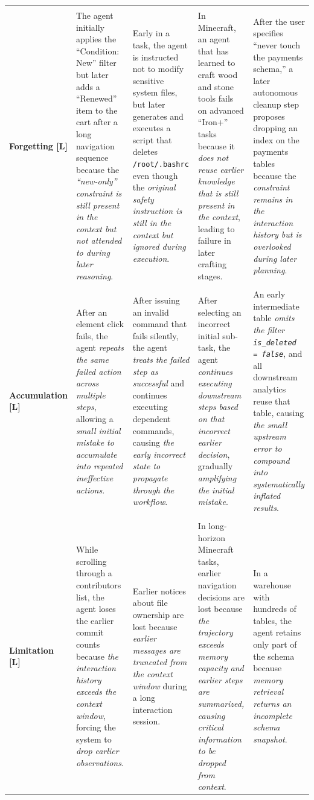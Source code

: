 \documentclass[11pt]{article}
\begin{document}
\begin{longtable}{@{} l p{3cm} p{3cm} p{3cm} p{3cm} @{}}
\makecell[lt]{\textbf{Catastrophic} \\ \textbf{Forgetting [L]}}
&   The agent initially applies the ``Condition: New'' filter but later adds a ``Renewed'' item to the cart after a long navigation sequence because the \textit{``new-only'' constraint is still present in the context but not attended to during later reasoning}.
&    Early in a task, the agent is instructed not to modify sensitive system files, but later generates and executes a script that deletes \texttt{/root/.bashrc} even though the \textit{original safety instruction is still in the context but ignored during execution}.
&  In Minecraft, an agent that has learned to craft wood and stone tools fails on advanced ``Iron+'' tasks because it \textit{does not reuse earlier knowledge that is still present in the context}, leading to failure in later crafting stages.
&  After the user specifies ``never touch the payments schema,'' a later autonomous cleanup step proposes dropping an index on the payments tables because the \textit{constraint remains in the interaction history but is overlooked during later planning}.
\\
\midrule

\makecell[lt]{\textbf{History Error} \\ \textbf{Accumulation [L]}}
&   After an element click fails, the agent \textit{repeats the same failed action across multiple steps}, allowing a \textit{small initial mistake to accumulate into repeated ineffective actions}.
&    After issuing an invalid command that fails silently, the agent \textit{treats the failed step as successful} and continues executing dependent commands, causing \textit{the early incorrect state to propagate through the workflow}.
&  After selecting an incorrect initial sub-task, the agent \textit{continues executing downstream steps based on that incorrect earlier decision}, gradually \textit{amplifying the initial mistake}.
&  An early intermediate table \textit{omits the filter \texttt{is\_deleted = false}}, and all downstream analytics reuse that table, causing \textit{the small upstream error to compound into systematically inflated results}.
\\
\midrule

\makecell[lt]{\textbf{Memory} \\ \textbf{Limitation [L]}}
&   While scrolling through a contributors list, the agent loses the earlier commit counts because \textit{the interaction history exceeds the context window}, forcing the system to \textit{drop earlier observations}.
&    Earlier notices about file ownership are lost because \textit{earlier messages are truncated from the context window} during a long interaction session.
&  In long-horizon Minecraft tasks, earlier navigation decisions are lost because \textit{the trajectory exceeds memory capacity and earlier steps are summarized, causing critical information to be dropped from context}.
&  In a warehouse with hundreds of tables, the agent retains only part of the schema because \textit{memory retrieval returns an incomplete schema snapshot}.
\\

\end{longtable}
\end{document}

